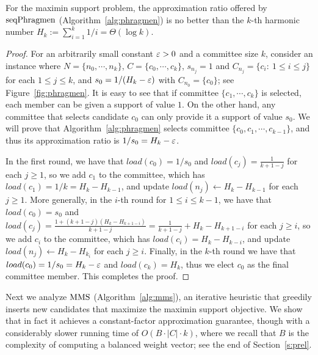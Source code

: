 \begin{lemma}\label{lem:phragmen}
For the maximin support problem, the approximation ratio offered by $\operatorname{seqPhragmen}$ (Algorithm~\ref{alg:phragmen}) is no better than the $k$-th harmonic number $H_k:=\sum_{i=1}^k 1/i = \Theta(\log k)$.
\end{lemma}

\begin{proof}
For an arbitrarily small constant $\varepsilon>0$ and a committee size $k$, consider an instance where $N=\{n_0, \cdots, n_k\}$, $C=\{c_0, \cdots, c_k\}$, $s_{n_j}=1$ and $C_{n_j}=\{c_i: \ 1\leq i\leq j\}$ for each $1\leq j\leq k$, and $s_0=1/(H_k - \varepsilon)$ with $C_{n_0}=\{c_0\}$; see Figure~\ref{fig:phragmen}. 
It is easy to see that if committee $\{c_1, \cdots, c_k\}$ is selected, each member can be given a support of value $1$. On the other hand, any committee that selects candidate $c_{0}$ can only provide it a support of value $s_0$. We will prove that Algorithm~\ref{alg:phragmen} selects committee $\{c_0, c_1, \cdots, c_{k-1}\}$, and thus its approximation ratio is $1/s_0 = H_k - \varepsilon$. 

In the first round, we have that $load(c_0)=1/s_0$ and $load(c_j)=\frac{1}{k+1-j}$ for each $j\geq 1$, so we add $c_1$ to the committee, which has $load(c_1)=1/k = H_k - H_{k-1}$, and update $load(n_j)\leftarrow H_k - H_{k-1}$ for each $j\geq 1$. 
More generally, in the $i$-th round for $1\leq i\leq k-1$, we have that $load(c_0)=s_0$ and $load(c_j)=\frac{1+(k+1-j)(H_k - H_{k+1-i})}{k+1-j}=\frac{1}{k+1-j}+H_k-H_{k+1-i}$ for each $j\geq i$, so we add $c_i$ to the committee, which has $load(c_i)=H_k - H_{k-i}$, and update $load(n_j)\leftarrow H_k - H_{k_i}$ for each $j\geq i$. 
Finally, in the $k$-th round we have that $load(c_0)=1/s_0 = H_k - \varepsilon$ and $load(c_k)=H_k$, thus we elect $c_0$ as the final committee member. This completes the proof.
\end{proof}

Next we analyze $\operatorname{MMS}$ (Algorithm~\ref{alg:mms}), an iterative heuristic that greedily inserts new candidates that maximize the maximin support objective. 
We show that in fact it achieves a constant-factor approximation guarantee, though with a considerably slower running time of $O(B\cdot |C|\cdot k)$, where we recall that $B$ is the complexity of computing a balanced weight vector; see the end of Section~\ref{s:prel}. 

